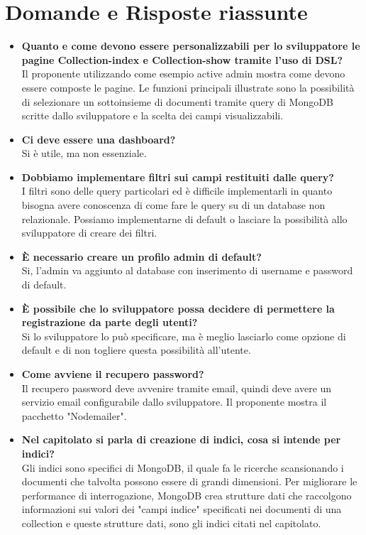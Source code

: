 \section{Domande e Risposte riassunte}
	\begin{itemize} 
		\item 
		{\bfseries Quanto e come devono essere personalizzabili per lo sviluppatore le pagine Collection-index
		e Collection-show tramite l'uso di DSL?} \\
		Il proponente utilizzando come esempio active admin mostra come devono essere composte le pagine.
		Le funzioni principali illustrate sono la possibilità di selezionare un sottoinsieme di documenti tramite query di MongoDB scritte
		dallo sviluppatore e la scelta dei campi visualizzabili.	
		
		\item 
		{\bfseries Ci deve essere una dashboard?} \\
		Si è utile, ma non essenziale. 
		
		\item
		{\bfseries Dobbiamo implementare filtri sui campi restituiti dalle query?} \\
		I filtri sono delle query particolari ed è difficile implementarli in quanto bisogna avere conoscenza di come fare le query su di un database non relazionale.
		Possiamo implementarne di default o lasciare la possibilità allo sviluppatore di creare dei filtri.
		
		\item
		{\bfseries È necessario creare un profilo admin di default?} \\
		Si, l'admin va aggiunto al database con inserimento di username e password di default.
		
		\item
		{\bfseries È possibile che lo sviluppatore possa decidere di permettere la registrazione da parte degli utenti?} \\
		 Si lo sviluppatore lo può specificare, ma è meglio lasciarlo come opzione di default e di non togliere questa possibilità
		 all'utente.
		
		\item
		{\bfseries Come avviene il recupero password?} \\
		Il recupero password deve avvenire tramite email, quindi \ProjectName{}deve avere un servizio email configurabile dallo sviluppatore.
		Il proponente mostra il pacchetto "Nodemailer".
		
		\item
		{\bfseries Nel capitolato si parla di creazione di indici, cosa si intende per indici?} \\
		Gli indici sono specifici di MongoDB, il quale fa le ricerche scansionando i documenti che talvolta possono essere di grandi dimensioni. Per migliorare le performance di interrogazione, MongoDB crea strutture dati che raccolgono informazioni sui valori dei "campi indice" specificati nei documenti di una collection e queste strutture dati, sono gli indici citati nel capitolato.
		

\end{itemize}
